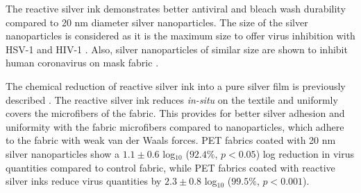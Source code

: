 \documentclass[10pt,letterpaper]{article}
\begin{document}
The reactive silver ink demonstrates better antiviral and bleach wash durability compared to 20 nm diameter silver nanoparticles. The size of the silver nanoparticles is considered as it is the maximum size to offer virus inhibition with HSV-1 and HIV-1  \cite{akbarzadeh:2018,elechiguerra_interaction_2005}. Also, silver nanoparticles of similar size are shown to inhibit human coronavirus on mask fabric \cite{abulikemu:2022}. 

The chemical reduction of reactive silver ink into a pure silver film is previously described \cite{Walker:12}. The reactive silver ink reduces \textit{in-situ}
on the textile and uniformly covers 
the microfibers of the fabric.
This provides for better silver adhesion and uniformity with the fabric microfibers compared to nanoparticles, which adhere to the fabric with weak van der Waals forces. 
PET fabrics coated with 20 nm silver nanoparticles %
show a $1.1 \pm 0.6$ log$_{10}$ ($92.4 %
\%$, $p < 0.05$) log reduction in virus quantities compared to control fabric, 
while PET fabrics coated with reactive silver inks reduce virus quantities by $2.3 \pm 0.8$ log$_{10}$ ($99.5 %
\%$, $p < 0.001$). 
\end{document}
